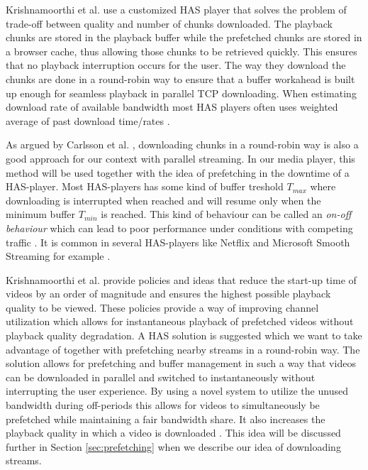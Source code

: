 Krishnamoorthi et al. \cite{qualbranch} use a customized HAS player that solves the problem of trade-off between quality and number of chunks downloaded. The playback chunks are stored in the playback buffer while the prefetched chunks are stored in a browser cache, thus allowing those chunks to be retrieved quickly. This ensures that no playback interruption occurs for the user. The way they download the chunks are done in a round-robin way to ensure that a buffer workahead is built up enough for seamless playback in parallel TCP downloading. When estimating download rate of available bandwidth most HAS players often uses weighted average of past download time/rates \cite{qualbranch}. 

As argued by Carlsson et al. \cite{optimizedstreaming}, downloading chunks in a round-robin way is also a good approach for our context with parallel streaming. In our media player, this method will be used together with the idea of prefetching in the downtime of a HAS-player. Most HAS-players has some kind of buffer treshold $T_{max}$ where downloading is interrupted when reached and will resume only when the minimum buffer $T_{min}$ is reached. This kind of behaviour can be called an \textit{on-off behaviour} which can lead to poor performance under conditions with competing traffic \cite{bandawarePrefetch,whathappens}. It is common in several HAS-players like Netflix and Microsoft Smooth Streaming for example \cite{bandawarePrefetch}. 

Krishnamoorthi et al. \cite{bandawarePrefetch} provide policies and ideas that reduce the start-up time of videos by an order of magnitude and ensures the highest possible playback quality to be viewed. These policies provide a way of improving channel utilization which allows for instantaneous playback of prefetched videos without playback quality degradation. A HAS solution is suggested which we want to take advantage of together with prefetching nearby streams in a round-robin way. The solution allows for prefetching and buffer management in such a way that videos can be downloaded in parallel and switched to instantaneously without interrupting the user experience. By using a novel system to utilize the unused bandwidth during off-periods this allows for videos to simultaneously be prefetched while maintaining a fair bandwidth share. It also increases the playback quality in which a video is downloaded \cite{bandawarePrefetch}. This idea will be discussed further in Section \ref{sec:prefetching} when we describe our idea of downloading streams.


